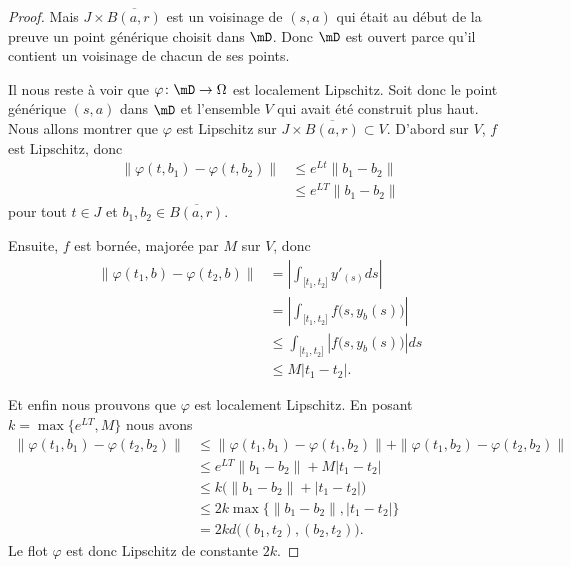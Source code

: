 \begin{proof}
    Mais \( J\times \overline{ B(a,r) }\) est un voisinage de \( (s,a)\) qui était au début de la preuve un point générique choisit dans \( \mD\). Donc \( \mD\) est ouvert parce qu'il contient un voisinage de chacun de ses points.

    Il nous reste à voir que \( \varphi\colon \mD\to \Omega\) est localement Lipschitz. Soit donc le point générique \( (s,a)\) dans \( \mD\) et l'ensemble $V$ qui avait été construit plus haut. Nous allons montrer que \( \varphi\) est Lipschitz sur \( J\times \overline{ B(a,r) }\subset V\). D'abord sur \( V\), \( f\) est Lipschitz, donc
    \begin{subequations}
        \begin{align}
            \| \varphi(t,b_1)-\varphi(t,b_2) \|&\leq  e^{Lt}\| b_1-b_2 \|\\
            &\leq  e^{LT}\| b_1-b_2 \|
        \end{align}
    \end{subequations}
    pour tout \( t\in J\) et \( b_1,b_2\in \overline{ B(a,r) }\).

    Ensuite, \( f\) est bornée, majorée par \( M\) sur $V$, donc
    \begin{subequations}
        \begin{align}
            \| \varphi(t_1,b)-\varphi(t_2,b) \|&=| \int_{\mathopen[ t_1 , t_2 \mathclose]} y'_(s)ds |\\
            &=| \int_{\mathopen[ t_1 , t_2 \mathclose]}f\big( s,y_b(s) \big) |\\
            &\leq \int_{\mathopen[ t_1 , t_2 \mathclose]}| f\big( s,y_b(s) \big) |ds\\
            &\leq M| t_1-t_2 |.
        \end{align}
    \end{subequations}
    
    Et enfin nous prouvons que \( \varphi\) est localement Lipschitz. En posant \( k=\max\{  e^{LT},M \}\) nous avons
    \begin{subequations}
        \begin{align}
            \| \varphi(t_1,b_1)-\varphi(t_2,b_2) \|&\leq \| \varphi(t_1,b_1)-\varphi(t_1,b_2) \|+\| \varphi(t_1,b_2)-\varphi(t_2,b_2) \|\\
            &\leq  e^{LT}\| b_1-b_2 \|+M| t_1-t_2 |\\
            &\leq k\big( \| b_1-b_2 \|+| t_1-t_2 | \big)\\
            &\leq 2k\max\{ \| b_1-b_2 \|,| t_1-t_2 | \}\\
            &=2kd\big(  (b_1,t_2),(b_2,t_2)  \big).
        \end{align}
    \end{subequations}
    Le flot \( \varphi\) est donc Lipschitz de constante \( 2k\).
\end{proof} 

